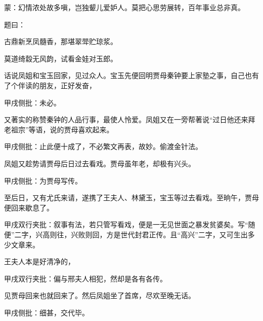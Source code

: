 
\begin{parag}
    \begin{note}蒙：幻情浓处故多嗔，岂独颦儿爱妒人。莫把心思劳展转，百年事业总非真。\end{note}
\end{parag}


\begin{parag}
    题曰：
\end{parag}


\begin{poem}
    \begin{pl}古鼎新烹凤髓香，那堪翠斝贮琼浆。\end{pl}

    \begin{pl}莫道绮縠无风韵，试看金娃对玉郎。\end{pl}
\end{poem}


\begin{parag}
    话说凤姐和宝玉回家，见过众人。宝玉先便回明贾母秦钟要上家塾之事，自己也有了个伴读的朋友，正好发奋，\begin{note}甲戌侧批：未必。\end{note}又著实的称赞秦钟的人品行事，最使人怜爱。凤姐又在一旁帮著说“过日他还来拜老祖宗”等语，说的贾母喜欢起来。\begin{note}甲戌侧批：止此便十成了，不必繁文再表，故妙。偷渡金针法。\end{note}凤姐又趁势请贾母后日过去看戏。贾母虽年老，却极有兴头。\begin{note}甲戌侧批：为贾母写传。\end{note}至后日，又有尤氏来请，遂携了王夫人、林黛玉，宝玉等过去看戏。至晌午，贾母便回来歇息了。\begin{note}甲戌双行夹批：叙事有法，若只管写看戏，便是一无见世面之暴发贫婆矣。写“随便”二字，兴高则往，兴败则回，方是世代封君正传。且“高兴”二字，又可生出多少文章来。\end{note}王夫人本是好清净的，\begin{note}甲戌双行夹批：偏与邢夫人相犯，然却是各有各传。\end{note}见贾母回来也就回来了。然后凤姐坐了首席，尽欢至晚无话。\begin{note}甲戌侧批：细甚，交代毕。\end{note}
\end{parag}


